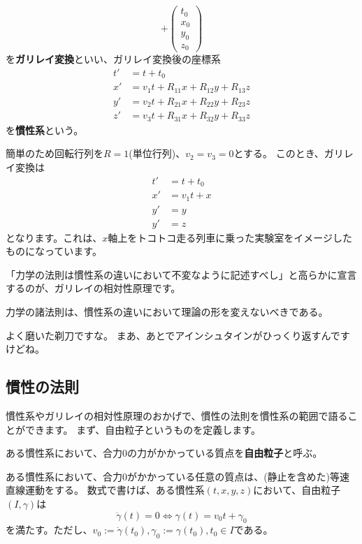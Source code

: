 \begin{definition}[ガリレイ変換と慣性系]
\[    +
    \begin{pmatrix}
      t_0\\x_0\\y_0\\z_0
    \end{pmatrix}
  \]
  を\textbf{ガリレイ変換}といい、ガリレイ変換後の座標系
  \begin{align*}
    t'&=t+t_0\\
    x'&=v_1t+R_{11}x+R_{12}y+R_{13}z\\
    y'&=v_2t+R_{21}x+R_{22}y+R_{23}z\\
    z'&=v_3t+R_{31}x+R_{32}y+R_{33}z
  \end{align*}
  を\textbf{慣性系}という。
\end{definition}

\begin{example}
  簡単のため回転行列を$R=1$(単位行列)、$v_2=v_3=0$とする。
  このとき、ガリレイ変換は
  \begin{align*}
    t'&=t+t_0\\
    x'&=v_1t+x\\
    y'&=y\\
    y'&=z
  \end{align*}
  となります。これは、$x$軸上をトコトコ走る列車に乗った実験室をイメージしたものになっています。
\end{example}

「力学の法則は慣性系の違いにおいて不変なように記述すべし」と高らかに宣言するのが、ガリレイの相対性原理です。
\begin{definition}[ガリレイの相対性原理]
  力学の諸法則は、慣性系の違いにおいて理論の形を変えないべきである。
\end{definition}
よく磨いた剃刀ですな。
まあ、あとでアインシュタインがひっくり返すんですけどね。

\subsection{慣性の法則}

慣性系やガリレイの相対性原理のおかげで、慣性の法則を慣性系の範囲で語ることができます。
まず、自由粒子というものを定義します。
\begin{definition}
  ある慣性系において、合力0の力がかかっている質点を\textbf{自由粒子}と呼ぶ。
\end{definition}
\begin{definition}[慣性の法則]
  ある慣性系において、合力0がかかっている任意の質点は、(静止を含めた)等速直線運動をする。
  数式で書けば、ある慣性系$(t,x,y,z)$において、自由粒子$(I,\gamma)$は
  \[
    \ddot\gamma(t)=0\iff\gamma(t)=v_0t+\gamma_0
  \]
  を満たす。ただし、$v_0:=\dot\gamma(t_0), \gamma_0:=\gamma(t_0), t_0\in I$である。
\end{definition}

